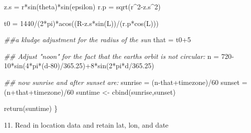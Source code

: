 \documentclass[
  letterpaper,
]{book}
\newenvironment{Shaded}{\begin{snugshade}}{\end{snugshade}}
\newcommand{\DecValTok}[1]{\textcolor[rgb]{0.68,0.00,0.00}{#1}}
\newcommand{\DocumentationTok}[1]{\textcolor[rgb]{0.37,0.37,0.37}{\textit{#1}}}
\newcommand{\FloatTok}[1]{\textcolor[rgb]{0.68,0.00,0.00}{#1}}
\newcommand{\FunctionTok}[1]{\textcolor[rgb]{0.28,0.35,0.67}{#1}}
\newcommand{\NormalTok}[1]{\textcolor[rgb]{0.00,0.23,0.31}{#1}}
\newcommand{\OtherTok}[1]{\textcolor[rgb]{0.00,0.23,0.31}{#1}}
\newcommand{\SpecialCharTok}[1]{\textcolor[rgb]{0.37,0.37,0.37}{#1}}
\begin{document}
\begin{Shaded}
\begin{Highlighting}[]
\NormalTok{  z.s }\OtherTok{=}\NormalTok{ r}\SpecialCharTok{*}\FunctionTok{sin}\NormalTok{(theta)}\SpecialCharTok{*}\FunctionTok{sin}\NormalTok{(epsilon)}
\NormalTok{  r.p }\OtherTok{=} \FunctionTok{sqrt}\NormalTok{(r}\SpecialCharTok{\^{}}\DecValTok{2}\SpecialCharTok{{-}}\NormalTok{z.s}\SpecialCharTok{\^{}}\DecValTok{2}\NormalTok{)}

\NormalTok{  t0 }\OtherTok{=} \DecValTok{1440}\SpecialCharTok{/}\NormalTok{(}\DecValTok{2}\SpecialCharTok{*}\NormalTok{pi)}\SpecialCharTok{*}\FunctionTok{acos}\NormalTok{((R}\SpecialCharTok{{-}}\NormalTok{z.s}\SpecialCharTok{*}\FunctionTok{sin}\NormalTok{(L))}\SpecialCharTok{/}\NormalTok{(r.p}\SpecialCharTok{*}\FunctionTok{cos}\NormalTok{(L)))}
  
  \DocumentationTok{\#\#a kludge adjustment for the radius of the sun}
\NormalTok{  that }\OtherTok{=}\NormalTok{ t0}\SpecialCharTok{+}\DecValTok{5} 

  \DocumentationTok{\#\# Adjust "noon" for the fact that the earth\textquotesingle{}s orbit is not circular:}
\NormalTok{  n }\OtherTok{=} \DecValTok{720{-}10}\SpecialCharTok{*}\FunctionTok{sin}\NormalTok{(}\DecValTok{4}\SpecialCharTok{*}\NormalTok{pi}\SpecialCharTok{*}\NormalTok{(d}\DecValTok{{-}80}\NormalTok{)}\SpecialCharTok{/}\FloatTok{365.25}\NormalTok{)}\SpecialCharTok{+}\DecValTok{8}\SpecialCharTok{*}\FunctionTok{sin}\NormalTok{(}\DecValTok{2}\SpecialCharTok{*}\NormalTok{pi}\SpecialCharTok{*}\NormalTok{d}\SpecialCharTok{/}\FloatTok{365.25}\NormalTok{)}

  \DocumentationTok{\#\# now sunrise and after sunset are:}
\NormalTok{  sunrise }\OtherTok{=}\NormalTok{ (n}\SpecialCharTok{{-}}\NormalTok{that}\SpecialCharTok{+}\NormalTok{timezone)}\SpecialCharTok{/}\DecValTok{60}
\NormalTok{  sunset }\OtherTok{=}\NormalTok{ (n}\SpecialCharTok{+}\NormalTok{that}\SpecialCharTok{+}\NormalTok{timezone)}\SpecialCharTok{/}\DecValTok{60}
\NormalTok{  suntime }\OtherTok{\textless{}{-}} \FunctionTok{cbind}\NormalTok{(sunrise,sunset)  }

  \FunctionTok{return}\NormalTok{(suntime)}
\NormalTok{\}}
\end{Highlighting}
\end{Shaded}

11. Read in location data and retain lat, lon, and date
\end{document}
